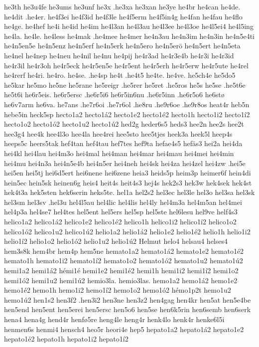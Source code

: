 he3th
he3u4fe
he3ums
he3unf
he3x
.he3xa
he3xan
he3ye
he4br
he4can
he4de.
he4dit
.he4er.
he4f3ei
he4f3id
he4f3le
he4f5erm
he4f5in4g
he4fan
he4fau
he4flo
he4ge.
he4hef
he4i
he4id
he4im
he4l3an
he4l3au
he4l3ee
he4l3oe
he4l5ei4
he4l5ing
he4la.
he4le.
he4less
he4mak
.he4mee
he4mer
he4n3au
he4n3im
he4n3in
he4n5e4ti
he4n5en5e
he4n5enz
he4n5erf
he4n5erk
he4n5ero
he4n5erö
he4n5ert
he4n5eta
he4nel
he4nep
he4neu
he4nil
he4nu
he4pij
he4r3ad
he4r3e4b
he4r3i
he4r3id
he4r3il
he4r3oh
he4r5eck
he4r5en5e
he4r5ent
he4r5erh
he4r5erw
he4r5ute
he4rel
he4rerf
he4ri.
he4ro.
he4se.
.he4sp
he4t
.he4t5
he4te.
he4ve.
he5ch4e
he5do5
he5kar
he5mo
he5ne
he5rane
he5reigr
.he5rer
he5ret
.he5ros
he5s
he5se
.he5t6e
he5t6i
he6r5eis.
he6r5ersc
.he6r5i6
he6r5in6nu
.he6r5inn
.he6r5o6
he6stø
he6v7arm
he6va.
he7ans
.he7r6oi
.he7r6ol
.he8ru
.he9r6oe
.he9r8os
heat4r
heb5n
hebe5in
heck5sp
hecto1a2
hecto1á2
hecto1e2
hecto1é2
hecto1h
hecto1i2
hecto1í2
hecto1o2
hecto1ó2
hecto1u2
hecto1ú2
hed2g
heder6s5
heds3
hee2n
hee2s
hee2t
hee3g4
hee4k
hee4l3o
hee4la
hee4rei
hee5sto
hee5tjes
heek3a
heek5l
heep4s
heeps5c
heers5tak
hef4tan
hef4tau
hef7tes
hef9ta
hefae4s5
hefäs3
hei2a
hei4da
hei4kl
hei4lau
hei4m3o
hei4mal
hei4man
hei4mar
hei4mau
hei4mei
hei4min
hei4mu
hei4n3a
hei4n5e4b
hei4n5er
hei4neh
hei4sk
hei4za
hei4zel
hei4zw
.hei5e
hei5en
hei5tj
hei6d5ert
hei6nene
hei6zene
heia3
heids5p
heim3p
heimer6f
hein4di
hein5ec
hein5sk
heinen6g
heis4
heit4s
heit4s3
hej4s
hek2s3
hek3w
hek4sek
hek4st
hek4t3a
hek5sten
hek6serin
heks5te.
hel1a
hel2s2
hel3ec
hel3le
hel3o
hel3sa
hel3sk
hel3sm
hel3sv
.hel3u
hel4l5au
hel4lic
hel4lis
hel4ly
hel4m3a
hel4m5an
hel4mei
hel4p3a
hel4se7
hel4tes
hel5ent
hel5ers
hel5sp
hel5ste
hel6lesu
hel9ve
helf4s3
helico1a2
helico1á2
helico1e2
helico1é2
helico1h
helico1i2
helico1í2
helico1o2
helico1ó2
helico1u2
helico1ú2
helio1a2
helio1á2
helio1e2
helio1é2
helio1h
helio1i2
helio1í2
helio1o2
helio1ó2
helio1u2
helio1ú2
Helmut
helo4
helsau4
helses4
hem3s8k
hem4br
hem4p
hem5ne
hemato1a2
hemato1á2
hemato1e2
hemato1é2
hemato1h
hemato1i2
hemato1í2
hemato1o2
hemato1ó2
hemato1u2
hemato1ú2
hemi1a2
hemi1á2
hémi1é
hemi1e2
hemi1é2
hemi1h
hemi1i2
hemi1í2
hemi1o2
hemi1ó2
hemi1u2
hemi1ú2
hemio3la.
hemio3las.
hemo1a2
hemo1á2
hemo1e2
hemo1é2
hemo1h
hemo1i2
hemo1í2
hemo1o2
hemo1ó2
hémo1p2t
hemo1u2
hemo1ú2
hen1s2
hen3f2
.hen3i2
hen3ne
hen3z2
hen4gag
hen4kr
hen5at
hen5e4be
hen5end
hen5ent
hen5erei
hen5ersc
hen5o6
hen5se
hen6k5rin
hen6semb
hen6serk
hena4
hena4g
hend4r
henfø5re
heng4le
heng4r
henk4lo
henk4r
henke6l5i
henmen6s
henmi4
hensch4
heo5r
heori4e
hep5
hepato1a2
hepato1á2
hepato1e2
hepato1é2
hepato1h
hepato1i2
hepato1í2
